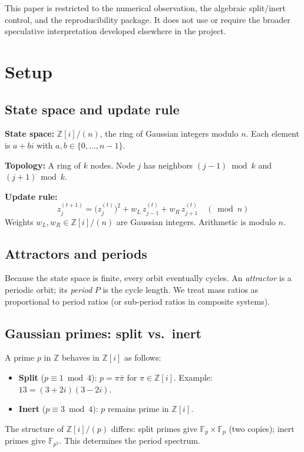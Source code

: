 \documentclass[11pt,a4paper]{article}
\begin{document}
This paper is restricted to the numerical observation, the algebraic split/inert control, and the reproducibility package. It does not use or require the broader speculative interpretation developed elsewhere in the project.

\section{Setup}

\subsection{State space and update rule}

\textbf{State space:} $\mathbb{Z}[i]/(n)$, the ring of Gaussian integers modulo $n$. Each element is $a+bi$ with $a,b \in \{0,\ldots,n-1\}$.

\textbf{Topology:} A ring of $k$ nodes. Node $j$ has neighbors $(j-1)\bmod k$ and $(j+1)\bmod k$.

\textbf{Update rule:}
\begin{equation}
z_j^{(t+1)} = \bigl(z_j^{(t)}\bigr)^2 + w_L\, z_{j-1}^{(t)} + w_R\, z_{j+1}^{(t)} \quad (\bmod n)
\end{equation}
Weights $w_L, w_R \in \mathbb{Z}[i]/(n)$ are Gaussian integers. Arithmetic is modulo $n$.

\subsection{Attractors and periods}

Because the state space is finite, every orbit eventually cycles. An \emph{attractor} is a periodic orbit; its \emph{period} $P$ is the cycle length. We treat mass ratios as proportional to period ratios (or sub-period ratios in composite systems).

\subsection{Gaussian primes: split vs.\ inert}

A prime $p$ in $\mathbb{Z}$ behaves in $\mathbb{Z}[i]$ as follows:
\begin{itemize}
\item \textbf{Split} ($p \equiv 1 \bmod 4$): $p = \pi \bar\pi$ for $\pi \in \mathbb{Z}[i]$. Example: $13 = (3+2i)(3-2i)$.
\item \textbf{Inert} ($p \equiv 3 \bmod 4$): $p$ remains prime in $\mathbb{Z}[i]$.
\end{itemize}
The structure of $\mathbb{Z}[i]/(p)$ differs: split primes give $\mathbb{F}_p \times \mathbb{F}_p$ (two copies); inert primes give $\mathbb{F}_{p^2}$. This determines the period spectrum.
\end{document}
